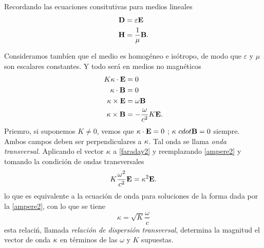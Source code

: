 \begin{tcolorbox}
	Recordando las ecuaciones consitutivas para medios lineales
	\begin{align}
		\vb{D} &= \varepsilon \vb{E} \\
		\vb{H} &= \frac{1}{\mu} \vb{B}.
	\end{align}
\end{tcolorbox}
Consideramos tambíen que el medio es homogéneo e isótropo, de modo que $\varepsilon$ y $\mu$ son escalares constantes. Y todo será en medios no magnéticos
\begin{align}
	K\vb{\kappa} \cdot \vb{E} &= 0 \\
	\vb{\kappa} \cdot \vb{B} &= 0 \\
	\vb{\kappa} \times \vb{E} &= \omega \vb{B} \label{faraday2} \\
	\vb{\kappa} \times \vb{B} &= -\frac{\omega}{c^2} K\vb{E}. \label{ampere2}
\end{align}
Priemro, si suponemos $K\neq 0$, vemos que $\vb{\kappa} \cdot \vb{E} = 0$ ; $\vb{\kappa}\ cdot \vb{B} = 0$ siempre. Ambos campos deben ser perpendiculares a $\vb{\kappa}$. Tal onda se llama \textit{onda transversal.} Aplicando el vector $\vb{\kappa}$ a \eqref{faraday2} y reemplazando \eqref{ampere2} y tomando la condición de ondas transversales
\begin{equation}
	K\frac{\omega ^2}{c^2} \vb{E} = \kappa ^2 \vb{E}.
\end{equation}
lo que es equivalente a la ecuación de onda para soluciones de la forma dada por la \eqref{ampere2}, con lo que se tiene
\begin{equation}
	\kappa = \sqrt{K} \frac{\omega}{c}
\end{equation}
esta relaciń, llamada \textit{relación de dispersión transversal}, determina la magnitud el vector de onda $\vb{\kappa}$ en términos de las $\omega$ y $K$ supuestas.


